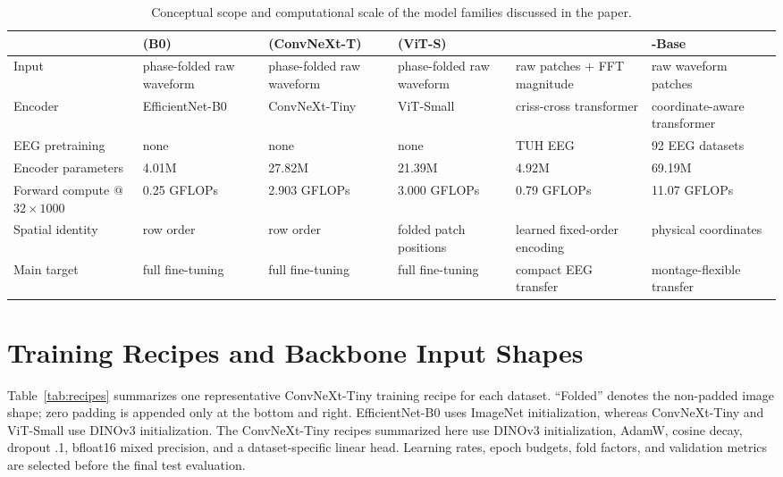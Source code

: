 \begin{table}[tbp]
\centering
\caption{Conceptual scope and computational scale of the model families discussed in the paper.}
\label{tab:model-scale}
\scriptsize
\renewcommand{\arraystretch}{1.06}
\begin{tabularx}{\textwidth}{@{}lXXXXX@{}}
\toprule
 & \method{} (B0) & \method{} (ConvNeXt-T) & \method{} (ViT-S) & \cbramod{} & \reve{}-Base \\
\midrule
Input & phase-folded raw waveform & phase-folded raw waveform & phase-folded raw waveform & raw patches + FFT magnitude & raw waveform patches \\
Encoder & EfficientNet-B0 & ConvNeXt-Tiny & ViT-Small & criss-cross transformer & coordinate-aware transformer \\
EEG pretraining & none & none & none & TUH EEG & 92 EEG datasets \\
Encoder parameters & 4.01M & 27.82M & 21.39M & 4.92M & 69.19M \\
Forward compute @$32\times1000$ & 0.25 GFLOPs & 2.903 GFLOPs & 3.000 GFLOPs & 0.79 GFLOPs & 11.07 GFLOPs \\
Spatial identity & row order & row order & folded patch positions & learned fixed-order encoding & physical coordinates \\
Main target & full fine-tuning & full fine-tuning & full fine-tuning & compact EEG transfer & montage-flexible transfer \\
\bottomrule
\end{tabularx}
\end{table}

\section{Training Recipes and Backbone Input Shapes}
\label{app:recipes}

Table~\ref{tab:recipes} summarizes one representative ConvNeXt-Tiny training
recipe for each dataset. ``Folded'' denotes the non-padded image shape; zero
padding is appended only at the bottom and right. EfficientNet-B0 uses
ImageNet initialization, whereas ConvNeXt-Tiny and ViT-Small use DINOv3
initialization. The ConvNeXt-Tiny recipes summarized here use DINOv3
initialization, AdamW, cosine decay, dropout .1, bfloat16 mixed precision, and
a dataset-specific linear head. Learning rates, epoch budgets, fold factors,
and validation metrics are selected before the final test evaluation.

